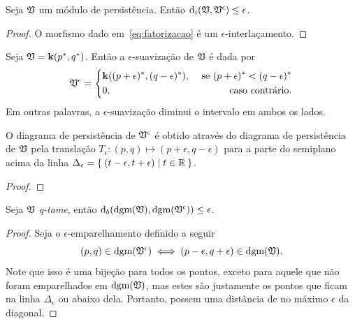 \begin{propo}\label{teo:smoothing}
    Seja $\mathfrak{V}$ um módulo de persistência. Então $\text{d}_i(\mathfrak{V}, \mathfrak{V}^\epsilon) \leq 
    \epsilon$.
\end{propo}
\begin{proof}
    O morfismo dado em~\ref{eq:fatorizacao} é um $\epsilon$-interlaçamento.
\end{proof}

\begin{ex}
    Seja $\mathfrak{V} = \mathbf{k}(p^*, q^*)$. Então a $\epsilon$-suavização de $\mathfrak{V}$ 
    é dada por 
    \begin{equation*}
        \mathfrak{V}^\epsilon = 
        \left\{
        \begin{split}
            &\mathbf{k}((p+\epsilon)^*, (q-\epsilon)^*), & \text{ se } (p+\epsilon)^* < (q - \epsilon)^* \\
            & 0, & \text{ caso contrário.}
        \end{split}
        \right.
    \end{equation*}
    Em outras palavras, a $\epsilon$-suavização diminui o intervalo em ambos os lados. 
\end{ex}

\begin{propo}\label{teo:shiftdgm}
    O diagrama de persistência de $\mathfrak{V}^\epsilon$ é obtido através do diagrama
    de persistência de $\mathfrak{V}$ pela translação $T_\epsilon \colon (p,q) \mapsto
    (p+\epsilon, q-\epsilon)$ para a parte do semiplano acima da linha 
    $\Delta_\epsilon = \Set{(t-\epsilon, t+\epsilon) | t \in \mathbb{R}}$. 
\end{propo}
\begin{proof}

\end{proof}

\begin{cor}\label{teo:corvolta}
    Seja $\mathfrak{V}$ \textit{q-tame}, então $\text{d}_b(\text{dgm}(\mathfrak{V}), \text{dgm}(\mathfrak{V}^\epsilon)) 
    \leq \epsilon$.
\end{cor}
\begin{proof}
    Seja o $\epsilon$-emparelhamento definido a seguir
    \begin{equation*}
        (p,q) \in \text{dgm}(\mathfrak{V}^\epsilon) \iff (p - \epsilon, q + \epsilon) \in \text{dgm}(\mathfrak{V}).
    \end{equation*}
    Note que isso é uma bijeção para todos os pontos, exceto para aquele que não foram emparelhados
    em $\text{dgm}(\mathfrak{V})$, mas estes são justamente os pontos que ficam na linha $\Delta_\epsilon$ ou abaixo
    dela. Portanto, possem uma distância de no máximo $\epsilon$ da diagonal. 
\end{proof}

